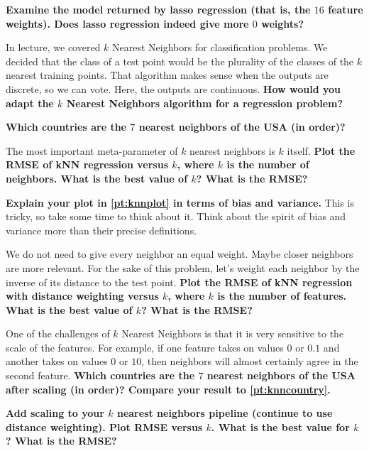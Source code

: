 \begin{Parts}
\Part \textbf{Examine the model returned by lasso regression (that is, the $16$ feature weights). Does lasso regression indeed give more $0$ weights?}




\Part In lecture, we covered $k$ Nearest Neighbors for classification problems. We decided that the class of a test point would be the plurality of the classes of the $k$ nearest training points. That algorithm makes sense when the outputs are discrete, so we can vote. Here, the outputs are continuous. \textbf{How would you adapt the $k$ Nearest Neighbors algorithm for a regression problem?}




\Part \label{pt:knncountry} \textbf{Which countries are the $7$ nearest neighbors of the USA (in order)?}




\Part \label{pt:knnplot} The most important meta-parameter of $k$ nearest neighbors is $k$ itself. \textbf{Plot the RMSE of kNN regression versus $k$, where $k$ is the number of neighbors. What is the best value of $k$? What is the RMSE?}




\Part \textbf{Explain your plot in \ref{pt:knnplot} in terms of bias and variance.} This is tricky, so take some time to think about it. Think about the spirit of bias and variance more than their precise definitions.




\Part We do not need to give every neighbor an equal weight. Maybe closer neighbors are more relevant. For the sake of this problem, let's weight each neighbor by the inverse of its distance to the test point. \textbf{Plot the RMSE of kNN regression with distance weighting versus $k$, where $k$ is the number of features. What is the best value of $k$? What is the RMSE?}




\Part One of the challenges of $k$ Nearest Neighbors is that it is very sensitive to the scale of the features. For example, if one feature takes on values $0$ or $0.1$ and another takes on values $0$ or $10$, then neighbors will almost certainly agree in the second feature. \textbf{Which countries are the $7$ nearest neighbors of the USA after scaling (in order)? Compare your result to \ref{pt:knncountry}.}




\Part \textbf{Add scaling to your $k$ nearest neighbors pipeline (continue to use distance weighting). Plot RMSE versus $k$. What is the best value for $k$? What is the RMSE?}





\end{Parts}
